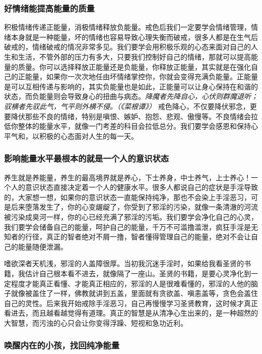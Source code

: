 \subsubsection{好情绪能提高能量的质量}

积极情绪传递正能量，消极情绪释放负能量。戒色后我们一定要学会情绪管理，情绪本身就是一种能量，坏的情绪也容易导致心理失衡而破戒，很多人都是在生气后破戒的，情绪破戒的情况非常多见。我们要学会用积极乐观的心态来面对自己的人生和生活，不管外部的压力有多大，只要我们控制好自己的情绪，那就可以提高能量的质量。你可以选择释放正能量还是负能量，你释放正能量，其实就是在强化自己的正能量，如果你一次次地任由坏情绪掌控你，你就会变得充满负能量。正能量是可以互相传递与影响的，其实负能量也是如此，正能量可以让身心保持在和谐的状态，而负能量则会导致身心的扭曲与病态。\textit{降魔者先降自心，心伏则群魔退听；驭横者先驭此气，气平则外横不侵。（《菜根谭》）} 戒色降心，不仅要降伏邪念，更要降伏那些不良的情绪，特别是嗔恨、嫉妒、抱怨、悲观、傲慢等。不良情绪会拉低你整体的能量水平，就像一门考差的科目会拉低总分。我们要学会感恩和保持心平气和，以积极的心态面对人生的每一天。

\subsubsection{影响能量水平最根本的就是一个人的意识状态}

养生就是养能量，养生的最高境界就是养心，下士养身，中士养气，上士养心！一个人的意识状态直接决定着一个人的健康水平。很多人都说自己的症状是手淫导致的，大家想一想，如果你的意识状态一直能保持纯净，那也不会染上手淫恶习，可是后来堕落发生了，你的心变龌龊了，你受到了邪淫的污染，就像一条清澈的河流被污染成臭河一样，你的心已经充满了邪淫的污垢。我们要学会净化自己的心灵，我们要学会储备自己的能量，呵护自己的能量，千万不可滥撸滥泄，疯狂手淫是无知者的行径，真正的智者绝对不屑一撸，智者懂得管理自己的能量，绝对不会让自己的能量随便泄漏。

嗜欲深者天机浅，邪淫的人盖障很厚。当初我沉迷手淫时，如果给我看圣贤的书籍，我估计自己根本看不进去，就像隔了一座山。圣贤的书籍，是要心灵净化到一定程度才能真正看懂、才能真正相应的，邪淫的人是很难看懂的，邪淫的人他的脑子就像被盖住了一样，佛教就讲到五盖，里面就有贪欲盖、嗔恚盖等，贪色会盖住自己的灵性。后来我开始戒除手淫恶习，自己再慢慢学习圣贤教育，这时候才真正看进去，而且越看越觉得有道理。真正的智慧是从清净心生出来的，是一种超然的大智慧，而污浊的心只会让你变得浮躁、短视和急功近利。

\subsubsection{唤醒内在的小孩，找回纯净能量}

